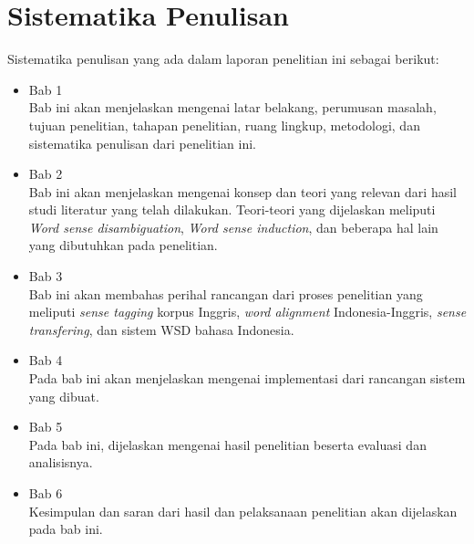 \section{Sistematika Penulisan}
Sistematika penulisan yang ada dalam laporan penelitian ini sebagai berikut:
\begin{itemize}
	
	\item Bab 1 \babSatu \\
	Bab ini akan menjelaskan mengenai latar belakang, perumusan masalah, tujuan penelitian, tahapan penelitian, ruang lingkup, metodologi, dan sistematika penulisan dari penelitian ini.
	
	\item Bab 2 \babDua \\
	Bab ini akan menjelaskan mengenai konsep dan teori yang relevan dari hasil studi literatur yang telah dilakukan. Teori-teori yang dijelaskan meliputi \textit{Word sense disambiguation}, \textit{Word sense induction}, dan beberapa hal lain yang dibutuhkan pada penelitian.
	
	\item Bab 3 \babTiga \\
	Bab ini akan membahas perihal rancangan dari proses penelitian yang meliputi \textit{sense tagging} korpus Inggris, \textit{word alignment} Indonesia-Inggris, \textit{sense transfering}, dan sistem WSD bahasa Indonesia.
	
	\item Bab 4 \babEmpat \\
	Pada bab ini akan menjelaskan mengenai implementasi dari rancangan sistem yang dibuat.
	
	\item Bab 5 \babLima \\
	Pada bab ini, dijelaskan mengenai hasil penelitian beserta evaluasi dan analisisnya. 
	
	\item Bab 6 \babEnam \\
	Kesimpulan dan saran dari hasil dan pelaksanaan penelitian akan dijelaskan pada bab ini.
	
\end{itemize}